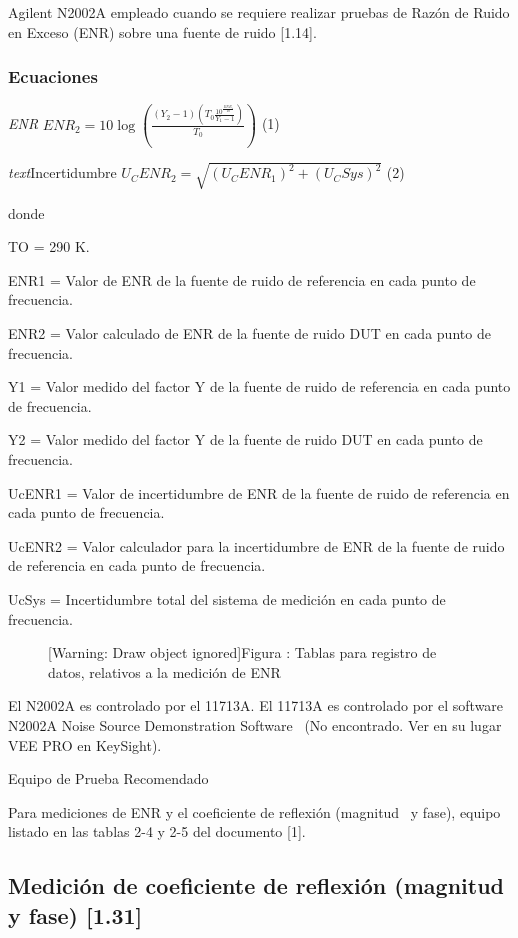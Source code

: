 Agilent N2002A empleado cuando se requiere realizar pruebas de Razón de Ruido en Exceso (ENR) sobre una fuente de ruido [1.14]. 

\subsubsection{Ecuaciones}
\emph{ENR}
$\mathit{ENR}_2=10\log (\frac{(Y_2-1)(T_0\frac{10^{\frac{\mathit{ENR}_1}{10}}}{Y_1-1})}{T_0})$ (1)

\emph{text}{Incertidumbre}
$U_C\mathit{ENR}_2=\sqrt{(U_C\mathit{ENR}_1)^2+(U_C\mathit{Sys})^2}$ (2)

donde

TO = 290 K.

ENR1 = Valor de ENR de la fuente de ruido de referencia en cada punto de frecuencia.

ENR2 = Valor calculado de ENR de la fuente de ruido DUT en cada punto de frecuencia.

Y1 = Valor medido del factor Y de la fuente de ruido de referencia en cada punto de frecuencia.

Y2 = Valor medido del factor Y de la fuente de ruido DUT en cada punto de frecuencia.

UcENR1 = Valor de incertidumbre de ENR de la fuente de ruido de referencia en cada punto de frecuencia.

UcENR2 = Valor calculador para la incertidumbre de ENR de la fuente de ruido de referencia en cada punto de frecuencia.

UcSys = Incertidumbre total del sistema de medición en cada punto de frecuencia.

	
\begin{figure}
\centering
\begin{minipage}{15.983cm}
	[Warning: Draw object ignored]Figura {\theDrawing\label{seq:refDrawing5}}: Tablas para registro
	de datos, relativos a la medición de ENR
\end{minipage}
\end{figure}
El N2002A es controlado por el 11713A. El 11713A es controlado por el software N2002A Noise Source Demonstration Software \ (No encontrado. Ver en su lugar VEE PRO en KeySight).

Equipo de Prueba Recomendado


Para mediciones de ENR y el coeficiente de reflexión (magnitud \ y fase), equipo listado en las tablas 2-4 y 2-5 del
documento [1].		

\subsection{Medición de coeficiente de reflexión (magnitud y fase) [1.31]}
